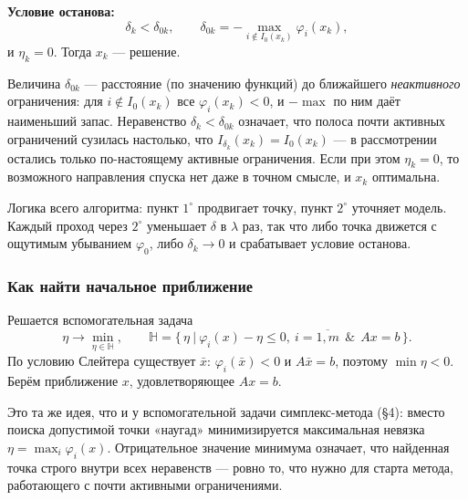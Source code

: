 \medskip
\noindent\textbf{Условие останова:}
\[
  \delta_k < \delta_{0k} ,
  \qquad
  \delta_{0k} = -\max_{i \notin I_0(x_k)} \varphi_i(x_k) ,
\]
и $\eta_k = 0$. Тогда $x_k$ — решение.

\begin{idea}
Величина $\delta_{0k}$ — расстояние (по значению функций) до ближайшего
\emph{неактивного} ограничения: для $i \notin I_0(x_k)$ все $\varphi_i(x_k) < 0$,
и $-\max$ по ним даёт наименьший запас. Неравенство $\delta_k < \delta_{0k}$
означает, что полоса почти активных ограничений сузилась настолько, что
$I_{\delta_k}(x_k) = I_0(x_k)$ — в рассмотрении остались только по-настоящему
активные ограничения. Если при этом $\eta_k = 0$, то возможного направления
спуска нет даже в точном смысле, и $x_k$ оптимальна.

Логика всего алгоритма: пункт $1^\circ$ продвигает точку, пункт $2^\circ$
уточняет модель. Каждый проход через $2^\circ$ уменьшает $\delta$ в $\lambda$
раз, так что либо точка движется с ощутимым убыванием $\varphi_0$, либо
$\delta_k \to 0$ и срабатывает условие останова.
\end{idea}

\subsubsection*{Как найти начальное приближение}

Решается вспомогательная задача
\[
  \eta \longrightarrow \min_{\eta \in \mathbb{H}} ,
  \qquad
  \mathbb{H} = \big\{\, \eta \ \big|\ \varphi_i(x) - \eta \le 0,\
    i = \overline{1,m} \ \ \&\ \ Ax = b \,\big\} .
\]
По условию Слейтера существует $\bar{x}$: $\varphi_i(\bar{x}) < 0$ и
$A\bar{x} = b$, поэтому $\min \eta < 0$. Берём приближение $x$, удовлетворяющее
$Ax = b$.

\begin{idea}
Это та же идея, что и у вспомогательной задачи симплекс-метода (\S4): вместо
поиска допустимой точки «наугад» минимизируется максимальная невязка
$\eta = \max_i \varphi_i(x)$. Отрицательное значение минимума означает, что
найденная точка строго внутри всех неравенств — ровно то, что нужно для старта
метода, работающего с почти активными ограничениями.
\end{idea}

